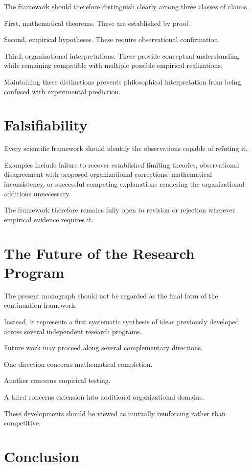 \documentclass[11pt,oneside]{book}
\numberwithin{equation}{chapter}
\theoremstyle{definition}
\theoremstyle{plain}
\begin{document}
The framework should therefore distinguish clearly among three classes of
claims.

First, mathematical theorems. These are established by proof.

Second, empirical hypotheses. These require observational confirmation.

Third, organizational interpretations. These provide conceptual
understanding while remaining compatible with multiple possible empirical
realizations.

Maintaining these distinctions prevents philosophical interpretation from
being confused with experimental prediction.

\section{Falsifiability}

Every scientific framework should identify the observations capable of
refuting it.

Examples include failure to recover established limiting theories,
observational disagreement with proposed organizational corrections,
mathematical inconsistency, or successful competing explanations rendering
the organizational additions unnecessary.

The framework therefore remains fully open to revision or rejection
wherever empirical evidence requires it.

\section{The Future of the Research Program}

The present monograph should not be regarded as the final form of the
continuation framework.

Instead, it represents a first systematic synthesis of ideas previously
developed across several independent research programs.

Future work may proceed along several complementary directions.

One direction concerns mathematical completion.

Another concerns empirical testing.

A third concerns extension into additional organizational domains.

These developments should be viewed as mutually reinforcing rather than
competitive.

\section{Conclusion}
\end{document}
